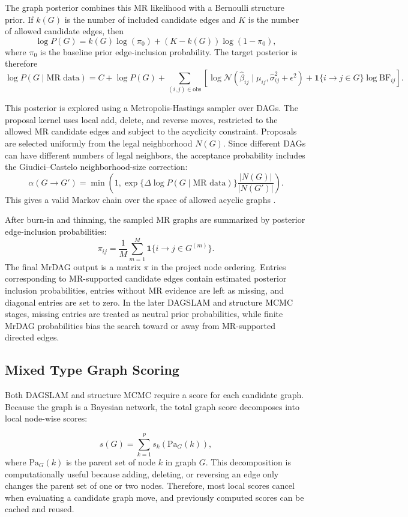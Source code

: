 \documentclass[11pt]{article}
\begin{document}
The graph posterior combines this MR likelihood with a Bernoulli structure prior. If \(k(G)\) is the number of included candidate edges and \(K\) is the number of allowed candidate edges, then
\[
\log P(G)
=
k(G)\log(\pi_0) + (K-k(G))\log(1-\pi_0),
\]
where \(\pi_0\) is the baseline prior edge-inclusion probability. The target posterior is therefore
\[
\log P(G \mid \text{MR data})
=
C + \log P(G)
+
\sum_{(i,j)\in \text{obs}}
\left[
\log \mathcal{N}
\left(
\hat{\beta}_{ij}
\mid
\mu_{ij},
\hat{\sigma}_{ij}^2 + \epsilon^2
\right)
+
\mathbf{1}\{i \to j \in G\}
\log \mathrm{BF}_{ij}
\right].
\]

This posterior is explored using a Metropolis-Hastings sampler over DAGs. The proposal kernel uses local add, delete, and reverse moves, restricted to the allowed MR candidate edges and subject to the acyclicity constraint. Proposals are selected uniformly from the legal neighborhood \(N(G)\). Since different DAGs can have different numbers of legal neighbors, the acceptance probability includes the Giudici--Castelo neighborhood-size correction:
\[
\alpha(G \to G')
=
\min\left(
1,
\exp\{\Delta \log P(G \mid \text{MR data})\}
\frac{|N(G)|}{|N(G')|}
\right).
\]
This gives a valid Markov chain over the space of allowed acyclic graphs
\citep{MadiganYork1995, GiudiciCastelo2003}.

After burn-in and thinning, the sampled MR graphs are summarized by posterior edge-inclusion probabilities:
\[
\pi_{ij}
=
\frac{1}{M}
\sum_{m=1}^M
\mathbf{1}\{i \to j \in G^{(m)}\}.
\]
The final MrDAG output is a matrix \(\pi\) in the project node ordering. Entries corresponding to MR-supported candidate edges contain estimated posterior inclusion probabilities, entries without MR evidence are left as missing, and diagonal entries are set to zero. In the later DAGSLAM and structure MCMC stages, missing entries are treated as neutral prior probabilities, while finite MrDAG probabilities bias the search toward or away from MR-supported directed edges.


\subsection{Mixed Type Graph Scoring}

Both DAGSLAM and structure MCMC require a score for each candidate graph. Because the graph is a Bayesian network, the total graph score decomposes into local node-wise scores:

\[
s(G) = \sum_{k=1}^p s_k(\mathrm{Pa}_G(k)),
\]
where $\mathrm{Pa}_G(k)$ is the parent set of node $k$ in graph $G$. This decomposition is computationally useful because adding, deleting, or reversing an edge only changes the parent set of one or two nodes. Therefore, most local scores cancel when evaluating a candidate graph move, and previously computed scores can be cached and reused.
\end{document}
